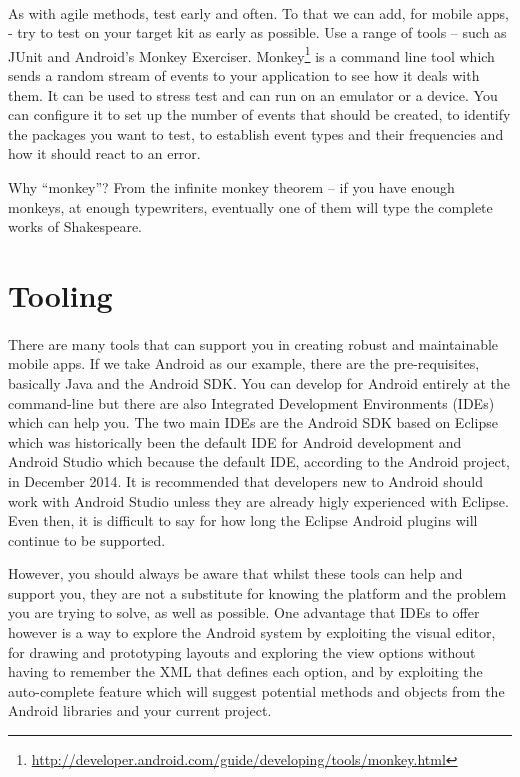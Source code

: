 \paragraph{} As with agile methods, test early and often. To that we can add, for mobile apps, - try to test on your target kit as early as possible. Use a range of tools – such as JUnit and Android’s Monkey Exerciser. Monkey\footnote{\url{http://developer.android.com/guide/developing/tools/monkey.html}} is a command line tool which sends a random stream of events to your application to see how it deals with them. It can be used to stress test and can run on an emulator or a device. You can configure it to set up the number of events that should be created, to identify the packages you want to test, to establish event types and their frequencies and how it should react to an error. 

\begin{framed}
Why ``monkey''? From the infinite monkey theorem – if you have enough monkeys, at enough typewriters, eventually one of them will type the complete works of Shakespeare.
\end{framed}



\section{Tooling}
\paragraph{} There are many tools that can support you in creating robust and maintainable mobile apps. If we take Android as our example, there are the pre-requisites, basically Java and the Android SDK. You can develop for Android entirely at the command-line but there are also Integrated Development Environments (IDEs) which can help you. The two main IDEs are the Android SDK based on Eclipse which was historically been the default IDE for Android development and Android Studio which because the default IDE, according to the Android project, in December 2014. It is recommended that developers new to Android should work with Android Studio unless they are already higly experienced with Eclipse. Even then, it is difficult to say for how long the Eclipse Android plugins will continue to be supported.

However, you should always be aware that whilst these tools can help and support you, they are not a substitute for knowing the platform and the problem you are trying to solve, as well as possible. One advantage that IDEs to offer however is a way to explore the Android system by exploiting the visual editor, for drawing and prototyping layouts and exploring the view options without having to remember the XML that defines each option, and by exploiting the auto-complete feature which will suggest potential methods and objects from the Android libraries and your current project.

